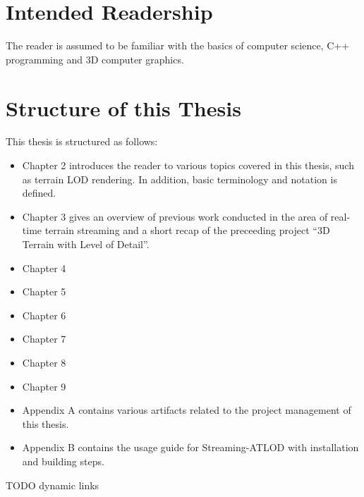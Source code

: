 

\section{Intended Readership}
The reader is assumed to be familiar with the basics of computer science,
C++ programming and 3D computer graphics.

\section{Structure of this Thesis}
This thesis is structured as follows:
\begin{itemize}
  \item Chapter 2 introduces the reader to various topics covered in this thesis, such as terrain LOD rendering. In addition, 
        basic terminology and notation is defined.
  \item Chapter 3 gives an overview of previous work conducted in the area of real-time terrain streaming and 
        a short recap of the preceeding project ``3D Terrain with Level of Detail''.
  \item Chapter 4
  \item Chapter 5
  \item Chapter 6
  \item Chapter 7
  \item Chapter 8
  \item Chapter 9
  \item Appendix A contains various artifacts related to the project management of this thesis.
  \item Appendix B contains the usage guide for Streaming-ATLOD with installation and building steps.
\end{itemize}

TODO dynamic links


